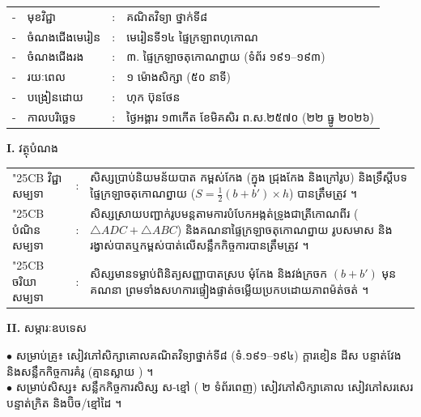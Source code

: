 \documentclass[a4paper,10pt]{article}
\newcommand{\wcirc}{{\symfont\char"25CB}}
\newcommand{\tri}[1]{\triangle #1}
\begin{document}
{\fontsize{10pt}{15.0pt}\selectfont
\hspace*{3.7cm}%
\begin{tabular}{@{}l l l l@{}}
  - & មុខវិជ្ជា & : & គណិតវិទ្យា ថ្នាក់ទី៨ \\
  - & ចំណងជើងមេរៀន & : & មេរៀនទី១៤ ផ្ទៃក្រឡាពហុកោណ \\
  - & ចំណងជើងរង & : & ៣. ផ្ទៃក្រឡាចតុកោណព្នាយ (ទំព័រ ១៩១--១៩៣) \\
  - & រយៈពេល & : & ១ ម៉ោងសិក្សា (៥០ នាទី) \\
  - & បង្រៀនដោយ & : & ហុក ប៊ុនថែន \\
  - & កាលបរិច្ឆេទ & : & ថ្ងៃអង្គារ ១៣កើត ខែមិគសិរ ព.ស.២៥៧០ (២២ ធ្នូ ២០២៦) \\
\end{tabular}

\vspace{1pt}

\textbf{I.} {\muol វត្ថុបំណង}\\[1pt]
\hspace*{0.55cm}%
\begin{tabular}{@{}l l L{14.2cm}@{}}
  \wcirc \hspace{0.25cm} វិជ្ជាសម្បទា & : & សិស្សប្រាប់និយមន័យបាត កម្ពស់កែង (ក្នុង ជ្រុងកែង និងក្រៅរូប) និងទ្រឹស្ដីបទផ្ទៃក្រឡាចតុកោណព្នាយ ($S = \frac{1}{2}(b + b') \times h$) បានត្រឹមត្រូវ ។ \\
  \wcirc \hspace{0.25cm} បំណិនសម្បទា & : & សិស្សស្រាយបញ្ជាក់រូបមន្តតាមការបំបែកអង្កត់ទ្រូងជាត្រីកោណពីរ ($\tri{ADC} + \tri{ABC}$) និងគណនាផ្ទៃក្រឡាចតុកោណព្នាយ រូបសមាស និងរង្វាស់បាតឬកម្ពស់បាត់លើសន្លឹកកិច្ចការបានត្រឹមត្រូវ ។ \\
  \wcirc \hspace{0.25cm} ចរិយាសម្បទា & : & សិស្សមានទម្លាប់ពិនិត្យសញ្ញាបាតស្រប មុំកែង និងវង់ក្រចក $(b+b')$ មុនគណនា ព្រមទាំងសហការផ្ទៀងផ្ទាត់ចម្លើយប្រកបដោយភាពម៉ត់ចត់ ។ \\
\end{tabular}

\vspace{1pt}

\textbf{II.} {\muol សម្ភារៈឧបទេស}\\[1pt]
\hspace*{0.55cm}\parbox[t]{18.2cm}{$\bullet$ \hspace{0.25cm} សម្រាប់គ្រូ៖ សៀវភៅសិក្សាគោលគណិតវិទ្យាថ្នាក់ទី៨ (ទំ.១៩១--១៩៤) ក្ដារខៀន ដីស បន្ទាត់វែង និងសន្លឹកកិច្ចការគំរូ (គ្មានស្លាយ ) ។\\
$\bullet$ \hspace{0.25cm} សម្រាប់សិស្ស៖ សន្លឹកកិច្ចការសិស្ស ស-ខ្មៅ ( ២ ទំព័រពេញ) សៀវភៅសិក្សាគោល សៀវភៅសរសេរ បន្ទាត់ក្រិត និងប៊ិច/ខ្មៅដៃ ។}

}
\end{document}
